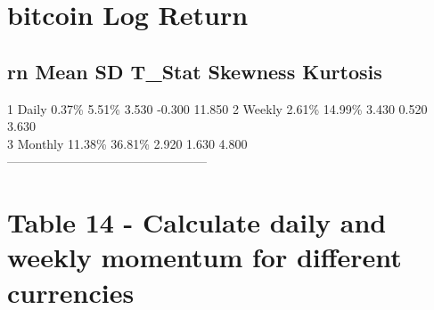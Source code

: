\documentclass[
]{article}
\begin{document}
\hypertarget{bitcoin-log-return}{%
\section{bitcoin Log Return}\label{bitcoin-log-return}}

\hypertarget{rn-mean-sd-t_stat-skewness-kurtosis}{%
\subsection{rn Mean SD T\_Stat Skewness
Kurtosis}\label{rn-mean-sd-t_stat-skewness-kurtosis}}

1 Daily 0.37\% 5.51\% 3.530 -0.300 11.850 2 Weekly 2.61\% 14.99\% 3.430
0.520 3.630\\
3 Monthly 11.38\% 36.81\% 2.920 1.630 4.800\\
------------------------------------------------

\hypertarget{table-14---calculate-daily-and-weekly-momentum-for-different-currencies}{%
\section{Table 14 - Calculate daily and weekly momentum for different
currencies}\label{table-14---calculate-daily-and-weekly-momentum-for-different-currencies}}
\end{document}
